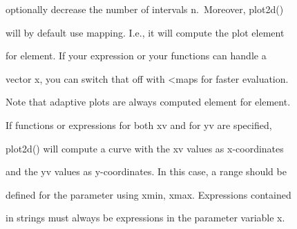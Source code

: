 \documentclass[
]{book}
\begin{document}
optionally decrease the number of intervals n.~Moreover, plot2d()

will by default use mapping. I.e., it will compute the plot element

for element. If your expression or your functions can handle a

vector x, you can switch that off with \textless maps for faster evaluation.

Note that adaptive plots are always computed element for element.

If functions or expressions for both xv and for yv are specified,

plot2d() will compute a curve with the xv values as x-coordinates

and the yv values as y-coordinates. In this case, a range should be

defined for the parameter using xmin, xmax. Expressions contained

in strings must always be expressions in the parameter variable x.

\backmatter
\end{document}
